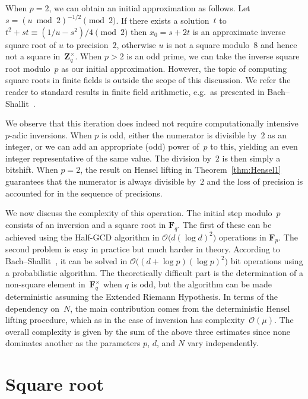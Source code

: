 When $p = 2$, we can obtain an initial approximation as follows. 
Let $s = (u \bmod 2)^{-1/2} \pmod{2}$.  If there exists a solution~$t$ 
to $t^2 + s t \equiv (1/u - s^2) / 4 \pmod{2}$ then $x_0 = s + 2 t$ 
is an approximate inverse square root of $u$ to precision~$2$, 
otherwise $u$ is not a square modulo~$8$ and hence not a square 
in~$\mathbf{Z}_q^{\times}$.  When $p > 2$ is an odd prime, we can 
take the inverse square root modulo~$p$ as our initial approximation.
However, the topic of computing square roots in finite fields is outside 
the scope of this discussion.  We refer the reader to standard 
results in finite field arithmetic, e.g.\ as presented in 
Bach--Shallit~\mbox{\citep[\S 7]{Bac96}}.

We observe that this iteration does indeed not require computationally 
intensive $p$-adic inversions.  When $p$ is odd, either the numerator 
is divisible by~$2$ as an integer, or we can add an appropriate (odd) 
power of~$p$ to this, yielding an even integer representative of the 
same value.  The division by~$2$ is then simply a bitshift.  When $p = 2$, 
the result on Hensel lifting in Theorem~\ref{thm:Hensel1} guarantees that 
the numerator is always divisible by~$2$ and the loss of precision is 
accounted for in the sequence of precisions.

We now discuss the complexity of this operation.  The initial step 
modulo~$p$ consists of an inversion and a square root in $\mathbf{F}_q$. 
The first of these can be achieved using the Half-GCD algorithm 
in $\mathcal{O}\bigl(d (\log d)^2\bigr)$ operations in $\mathbf{F}_p$.  
The second problem is easy in practice but much harder in theory.  According 
to Bach--Shallit~\citep[\S 7, Exercise~34]{Bac96}, 
it can be solved in $\mathcal{O}\bigl((d + \log p) (\log p)^2\bigr)$ 
bit operations using a probabilistic algorithm.  The theoretically 
difficult part is the determination of a non-square element 
in~$\mathbf{F}_q^{\times}$ when $q$ is odd, but the algorithm can be 
made deterministic assuming the Extended Riemann Hypothesis.  In terms 
of the dependency on~$N$, the main contribution comes from the 
deterministic Hensel lifting procedure, which as in the case of 
inversion has complexity~$\mathcal{O}(\mu)$.  The overall complexity 
is given by the sum of the above three estimates since none dominates 
another as the parameters $p$, $d$, and $N$ vary independently.

\section{Square root}

